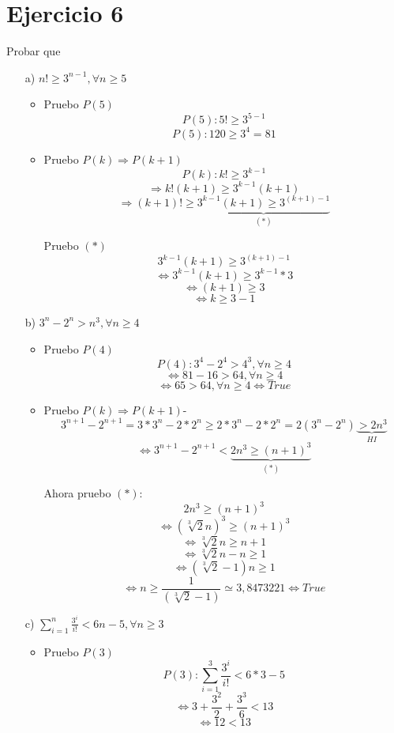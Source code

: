 \documentclass[10pt,a4paper]{article}
\begin{document}
\section*{Ejercicio 6}
Probar que
\begin{enumerate}
\item[a)]$n!\geq 3^{n-1},\forall n \geq 5$
	\begin{itemize}
	\item Pruebo $P(5)$
	$$P(5):5!\geq 3^{5-1}$$
	$$P(5): 120 \geq 3^{4}= 81$$	
	
	\item Pruebo $P(k)\Rightarrow P(k+1)$
	$$P(k):k!\geq 3^{k-1}$$
	$$\Rightarrow k! (k+1)\geq 3^{k-1}(k+1)$$
	$$\Rightarrow (k+1)!\geq \underbrace{3^{k-1}(k+1) \geq 3^{(k+1)-1}}_{(*)}$$
	
	Pruebo $(*)$
	$$3^{k-1}(k+1) \geq 3^{(k+1)-1}$$
	$$\Leftrightarrow 3^{k-1}(k+1) \geq 3^{k-1}*3$$
	$$\Leftrightarrow (k+1) \geq 3$$
	$$\Leftrightarrow k \geq 3-1$$
	\end{itemize}
	
\item[b)]$3^{n}-2^{n}>n^{3},\forall n\geq 4$
	\begin{itemize}
		\item Pruebo $P(4)$
		$$P(4):3^{4}-2^{4}>4^{3},\forall n\geq 4$$
		$$\Leftrightarrow 81-16 >64,\forall n\geq 4$$
		$$\Leftrightarrow 65 >64,\forall n\geq 4 \Leftrightarrow True$$
		
		\item Pruebo $P(k)\Rightarrow P(k+1)$-
		$$3^{n+1}-2^{n+1}= 3*3^{n}-2*2^{n} \geq 2*3^{n}-2*2^{n}=2(3^{n}-2^{n})\underbrace{>2n^{3}}_{HI} $$
		$$\Leftrightarrow 3^{n+1}-2^{n+1}< \underbrace{  2n^{3} \geq (n+1)^3}_{(*)}$$
		
		Ahora pruebo $(*)$:
		$$ 2n^{3} \geq (n+1)^3$$
		$$\Leftrightarrow (\sqrt[3]{2}n)^{3}\geq (n+1)^{3}$$
		$$\Leftrightarrow \sqrt[3]{2}n\geq n+1$$
		$$\Leftrightarrow \sqrt[3]{2}n-n\geq 1$$
		$$\Leftrightarrow (\sqrt[3]{2}-1)n\geq 1$$
		$$\Leftrightarrow n\geq \frac{1}{(\sqrt[3]{2}-1)}\simeq 3,8473221 \Leftrightarrow True$$
	\end{itemize}
	
\item[c)]$\sum^{n}_{i=1}\frac{3^{i}}{i!}<6n-5, \forall n\geq 3$	
	\begin{itemize}
	\item Pruebo $P(3)$
	$$P(3):\sum^{3}_{i=1}\frac{3^{i}}{i!}<6*3-5$$
	$$\Leftrightarrow 3+ \frac{3^{2}}{2}+ \frac{3^{3}}{6} <13$$
	$$\Leftrightarrow 12<13$$
	

\end{itemize}
\end{enumerate}
\end{document}
